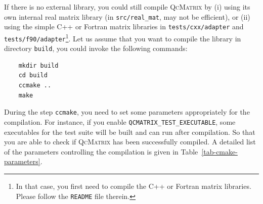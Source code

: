 \documentclass[a4paper,11pt,twoside,openright]{book}
\begin{document}
If there is no external library, you could still compile \textsc{QcMatrix} by (i) using
its own internal real matrix library (in \verb|src/real_mat|, may not be efficient), or
(ii) using the simple C++ or Fortran matrix libraries in \verb|tests/cxx/adapter| and
\verb|tests/f90/adapter|\footnote{In that case, you first need to compile the C++ or
Fortran matrix libraries. Please follow the \texttt{README} file therein.}. Let us
assume that you want to compile the library in directory \verb|build|, you could
invoke the following commands:
\begin{verbatim}
    mkdir build
    cd build
    ccmake ..
    make
\end{verbatim}
During the step \verb|ccmake|, you need to set some parameters appropriately for the
compilation. For instance, if you enable \verb|QCMATRIX_TEST_EXECUTABLE|, some executables
for the test suite will be built and can run after compilation. So that you are able to
check if \textsc{QcMatrix} has been successfully compiled. A detailed list of the parameters
controlling the compilation is given in Table~\ref{tab-cmake-parameters}.
\end{document}
